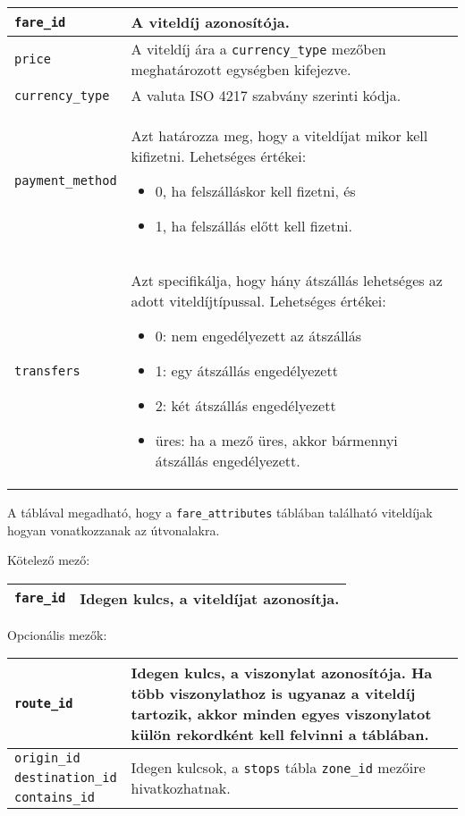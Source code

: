 \begin{tabular}{|p{3.5cm}|p{10cm}|}
\hline
\texttt{fare\_id} & A viteldíj azonosítója. \\
\hline
\texttt{price} & A viteldíj ára a \texttt{currency\_type} mezőben meghatározott egységben kifejezve. \\
\hline
\texttt{currency\_type} & A valuta ISO 4217 szabvány szerinti kódja. \\
\hline
\texttt{payment\_method} & Azt határozza meg, hogy a viteldíjat mikor kell kifizetni.
Lehetséges értékei:
\begin{itemize}
\item 0, ha felszálláskor kell fizetni, és
\item 1, ha felszállás előtt kell fizetni.
\end{itemize}
\\
\hline
\texttt{transfers} & Azt specifikálja, hogy hány átszállás lehetséges az adott viteldíjtípussal.
Lehetséges értékei:
\begin{itemize}
\item 0: nem engedélyezett az átszállás
\item 1: egy átszállás engedélyezett
\item 2: két átszállás engedélyezett
\item üres: ha a mező üres, akkor bármennyi átszállás engedélyezett.
\end{itemize}
\\
\hline
\end{tabular}


A táblával megadható, hogy a \texttt{fare\_attributes} táblában található viteldíjak hogyan vonatkozzanak az útvonalakra.

\newpage

\noindent Kötelező mező:

\bigskip

\begin{tabular}{|p{3cm}|p{10cm}|}
\hline
\texttt{fare\_id} & Idegen kulcs, a viteldíjat azonosítja. \\
\hline
\end{tabular}

\bigskip

\noindent Opcionális mezők:

\bigskip



\begin{tabular}{|p{3.5cm}|p{9.5cm}|}
\hline
\texttt{route\_id} & Idegen kulcs, a viszonylat azonosítója. Ha több viszonylathoz is ugyanaz a viteldíj tartozik, akkor minden egyes viszonylatot külön rekordként kell felvinni a táblában. \\
\hline
\texttt{origin\_id} & \multirow{3}{10cm}{Idegen kulcsok, a \texttt{stops} tábla \texttt{zone\_id} mezőire hivatkozhatnak.} \\
\cline{1-1}
\texttt{destination\_id} & \\
\cline{1-1}
\texttt{contains\_id} & \\
\hline
\end{tabular}

